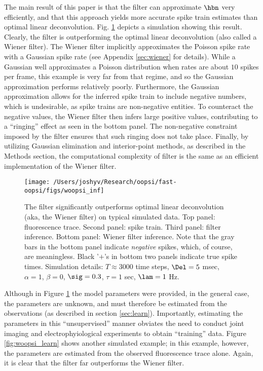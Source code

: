 The main result of this paper is that the \foopsi filter can approximate $\hbn$ very efficiently, and that this approach yields more accurate spike train estimates than optimal linear deconvolution.  Fig. \ref{fig:woopsi_inf} depicts a simulation showing this result. Clearly, the \foopsi filter is outperforming the optimal linear deconvolution  (also called a Wiener filter).  The Wiener filter implicitly approximates the Poisson spike rate with a Gaussian spike rate (see Appendix \ref{sec:wiener} for details). While a Gaussian well approximates a Poisson distribution when rates are about $10$ spikes per frame, this example is very far from that regime, and so the Gaussian approximation performs relatively poorly. Furthermore, the Gaussian approximation allows for the inferred spike train to include negative numbers, which is undesirable, as spike trains are non-negative entities.  To counteract the negative values, the Wiener filter then infers large positive values, contributing to a ``ringing'' effect as seen in the bottom panel.  The non-negative constraint imposed by the \foopsi filter ensures that such ringing does not take place.  Finally, by utilizing Gaussian elimination and interior-point methods, as described in the Methods section, the computational complexity of \foopsi filter is the same as an efficient implementation of the Wiener filter.  


\begin{figure}[h!]
\centering \texttt{[image: /Users/joshyv/Research/oopsi/fast-oopsi/figs/woopsi\_inf]}
\caption[\foopsi filter outperforms Wiener filter]{The \foopsi filter significantly outperforms optimal linear deconvolution (aka, the Wiener filter) on typical simulated data. Top panel: fluorescence trace.  Second panel: spike train.  Third panel: \foopsi filter inference.  Bottom panel: Wiener filter inference.  Note that the gray bars in the bottom panel indicate \emph{negative} spikes, which, of course, are meaningless. Black '$+$'s in bottom two panels indicate true spike times.  Simulation details: $T\approx 3000$ time steps, $\Del=5$ msec, $\alpha=1$, $\beta=0$, $\sig=0.3$, $\tau=1$ sec, $\lam=1$ Hz.} \label{fig:woopsi_inf}
\end{figure}


Although in Figure \ref{fig:woopsi_inf} the model parameters were provided, in the general case, the parameters are unknown, and must therefore be estimated from the observations (as described in section \ref{sec:learn}). Importantly, estimating the parameters in this ``unsupervised'' manner obviates the need to conduct joint imaging and electrophyiological experiments to obtain ``training'' data.  Figure \ref{fig:woopsi_learn} shows another simulated example; in this example, however, the parameters are estimated from the observed fluorescence trace alone.  Again, it is clear that the \foopsi filter far outperforms the Wiener filter.

